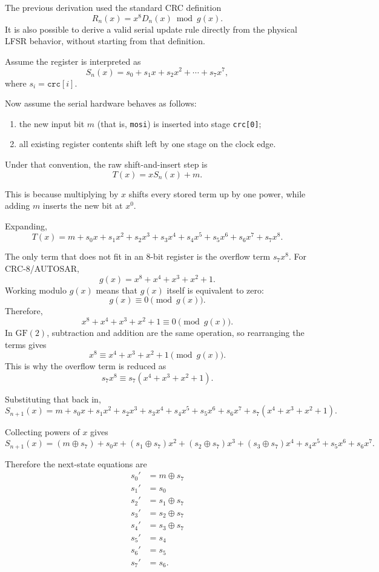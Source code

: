 \documentclass[11pt]{article}
\begin{document}
The previous derivation used the standard CRC definition
\[
R_n(x) = x^8 D_n(x) \bmod g(x).
\]
It is also possible to derive a valid serial update rule directly from the physical
LFSR behavior, without starting from that definition.

Assume the register is interpreted as
\[
S_n(x) = s_0 + s_1 x + s_2 x^2 + \cdots + s_7 x^7,
\]
where $s_i = \texttt{crc}[i]$.

Now assume the serial hardware behaves as follows:
\begin{enumerate}
\item the new input bit $m$ (that is, \texttt{mosi}) is inserted into stage \texttt{crc[0]};
\item all existing register contents shift left by one stage on the clock edge.
\end{enumerate}

Under that convention, the raw shift-and-insert step is
\[
T(x) = xS_n(x) + m.
\]

This is because multiplying by $x$ shifts every stored term up by one power, while
adding $m$ inserts the new bit at $x^0$.

Expanding,
\[
T(x) = m + s_0 x + s_1 x^2 + s_2 x^3 + s_3 x^4 + s_4 x^5 + s_5 x^6 + s_6 x^7 + s_7 x^8.
\]

The only term that does not fit in an 8-bit register is the overflow term $s_7 x^8$.
For CRC-8/AUTOSAR,
\[
g(x) = x^8 + x^4 + x^3 + x^2 + 1.
\]
Working modulo $g(x)$ means that $g(x)$ itself is equivalent to zero:
\[
g(x) \equiv 0 \pmod{g(x)}.
\]
Therefore,
\[
x^8 + x^4 + x^3 + x^2 + 1 \equiv 0 \pmod{g(x)}.
\]
In $\mathrm{GF}(2)$, subtraction and addition are the same operation, so rearranging
the terms gives
\[
x^8 \equiv x^4 + x^3 + x^2 + 1 \pmod{g(x)}.
\]
This is why the overflow term is reduced as
\[
s_7 x^8 \equiv s_7(x^4 + x^3 + x^2 + 1).
\]

Substituting that back in,
\[
S_{n+1}(x) =
m + s_0 x + s_1 x^2 + s_2 x^3 + s_3 x^4 + s_4 x^5 + s_5 x^6 + s_6 x^7
+ s_7(x^4 + x^3 + x^2 + 1).
\]

Collecting powers of $x$ gives
\[
S_{n+1}(x) =
(m \oplus s_7)
+ s_0 x
+ (s_1 \oplus s_7)x^2
+ (s_2 \oplus s_7)x^3
+ (s_3 \oplus s_7)x^4
+ s_4 x^5
+ s_5 x^6
+ s_6 x^7.
\]

Therefore the next-state equations are
\begin{align*}
s_0' &= m \oplus s_7 \\
s_1' &= s_0 \\
s_2' &= s_1 \oplus s_7 \\
s_3' &= s_2 \oplus s_7 \\
s_4' &= s_3 \oplus s_7 \\
s_5' &= s_4 \\
s_6' &= s_5 \\
s_7' &= s_6.
\end{align*}
\end{document}
